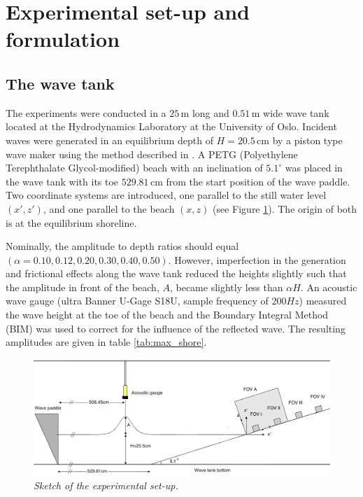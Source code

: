 \documentclass[review, authoryear]{elsarticle}
\newcommand{\cm}{\,\mbox{cm}}
\newcommand{\m}{\,\mbox{m}}
\begin{document}
\section{Experimental set-up and formulation}
\label{experimnetal-set-up}

\subsection{The wave tank}
\label{wavetank}

The experiments were conducted in  a $25\m$ long and $0.51\m$ wide wave tank 
located at the Hydrodynamics Laboratory at the University of Oslo.
Incident waves were generated in an equilibrium depth of $H=20.5\cm$ by
a piston type wave maker using the method described in 
\cite{jensen2003experimental}. 
A PETG (Polyethylene Terephthalate Glycol-modified) beach with an inclination of $5.1^{\circ}$ was placed in the wave tank with its toe $529.81\cm$ from the start position of the wave paddle. Two coordinate systems are introduced, one parallel to the still water level $(x',z')$, and one parallel to the beach $(x,z)$ (see Figure \ref{fig:beach_tegning}).  The origin of both is at the equilibrium shoreline.

Nominally, the amplitude to depth ratios should equal $(\alpha=0.10,0.12,0.20,0.30,0.40,0.50)$.  
However, imperfection in the generation and frictional effects along
the wave tank reduced the heights slightly such that the amplitude in front of the
beach, $A$, became slightly less than $\alpha H$.  
An acoustic wave gauge (ultra Banner U-Gage S18U, sample frequency of $200Hz$) measured the wave height at the toe of the beach and the Boundary Integral Method (BIM) was used to correct for  the influence of the reflected wave.
The resulting amplitudes are given in table \ref{tab:max_shore}.


\begin{figure}[]
\centering
\includegraphics[width=\textwidth]{./Figures/setup3.png}
\caption{\textit{ Sketch of  the experimental set-up.}}
\label{fig:beach_tegning}
\end{figure}
\end{document}

